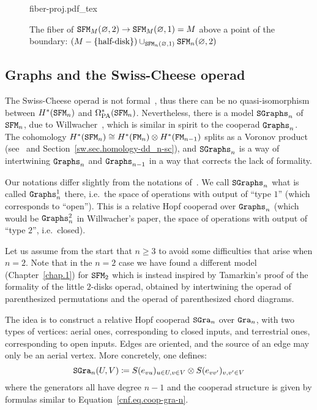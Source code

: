 \begin{figure}[htbp]
  \centering
  \def\svgwidth{0.7\textwidth}
  {fiber-proj.pdf_tex}
  \caption{The fiber of $\mathtt{SFM}_M(\varnothing, 2) \to \mathtt{SFM}_M(\varnothing, 1) = M$ above a point of the boundary: $(M - \{\text{half-disk}\}) \cup_{\mathtt{SFM}_{n}(\varnothing,1)} \mathtt{SFM}_{n}(\varnothing, 2)$}
  \label{fig.fiber-proj}
\end{figure}

\subsection{Graphs and the Swiss-Cheese operad}
\label{cnfbnd.sec.extens-swiss-cheese}

The Swiss-Cheese operad is not formal~\cite{Livernet2015,Willwacher2017a}, thus there can be no quasi-iso\-mor\-phism between $H^{*}(\mathtt{SFM}_{n})$ and $\Omega_{\mathrm{PA}}^{*}(\mathtt{SFM}_{n})$.
Nevertheless, there is a model $\mathtt{SGraphs}_{n}$ of $\mathtt{SFM}_{n}$, due to Willwacher~\cite{Willwacher2015a}, which is similar in spirit to the cooperad $\mathtt{Graphs}_{n}$.
The cohomology $H^{*}(\mathtt{SFM}_{n}) \cong H^{*}(\mathtt{FM}_{n}) \otimes H^{*}(\mathtt{FM}_{n-1})$ splits as a Voronov product (see~\cite{Voronov1999} and Section~\ref{sw.sec.homology-dd_n-sc}), and $\mathtt{SGraphs}_{n}$ is a way of intertwining $\mathtt{Graphs}_{n}$ and $\mathtt{Graphs}_{n-1}$ in a way that corrects the lack of formality.

\begin{remark}
  Our notations differ slightly from the notations of~\cite{Willwacher2015a}.
  We call $\mathtt{SGraphs}_{n}$ what is called $\mathtt{Graphs}_{n}^{1}$ there, i.e.\ the space of operations with output of ``type $1$'' (which corresponds to ``open'').
  This is a relative Hopf cooperad over $\mathtt{Graphs}_{n}$ (which would be $\mathtt{Graphs}_{n}^{2}$ in Willwacher's paper, the space of operations with output of ``type $2$'', i.e.\ closed).
\end{remark}

Let us assume from the start that $n \geq 3$ to avoid some difficulties that arise when $n = 2$.
Note that in the $n = 2$ case we have found a different model (Chapter~\ref{chap.1}) for $\mathtt{SFM}_{2}$ which is instead inspired by Tamarkin's proof of the formality of the little $2$-disks operad, obtained by intertwining the operad of parenthesized permutations and the operad of parenthesized chord diagrams.

The idea is to construct a relative Hopf cooperad $\mathtt{SGra}_{n}$ over $\mathtt{Gra}_{n}$, with two types of vertices: aerial ones, corresponding to closed inputs, and terrestrial ones, corresponding to open inputs.
Edges are oriented, and the source of an edge may only be an aerial vertex.
More concretely, one defines:
\begin{equation}
  \mathtt{SGra}_{n}(U,V) \coloneqq S(e_{vu})_{u \in U, v \in V} \otimes S(e_{vv'})_{v, v' \in V}
\end{equation}
where the generators all have degree $n-1$ and the cooperad structure is given by formulas similar to Equation~\eqref{cnf.eq.coop-gra-n}.

